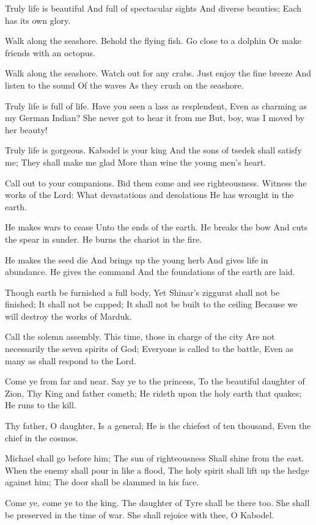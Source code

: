\documentclass[
]{book}
\begin{document}
Truly life is beautiful
And full of spectacular sights
And diverse beauties;
Each has its own glory.

Walk along the seashore.
Behold the flying fish.
Go close to a dolphin
Or make friends with an octopus.

Walk along the seashore.
Watch out for any crabs.
Just enjoy the fine breeze
And listen to the sound
Of the waves
As they crush on the seashore.

Truly life is full of life.
Have you seen a lass as resplendent,
Even as charming as my German Indian?
She never got to hear it from me
But, boy, was I moved by her beauty!

Truly life is gorgeous.
Kabodel is your king
And the sons of tsedek shall satisfy me;
They shall make me glad
More than wine the young men's heart.

Call out to your companions.
Bid them come and see righteousness.
Witness the works of the Lord:
What devastations and desolations
He has wrought in the earth.

He makes wars to cease
Unto the ends of the earth.
He breaks the bow
And cuts the spear in sunder.
He burns the chariot in the fire.

He makes the seed die
And brings up the young herb
And gives life in abundance.
He gives the command
And the foundations of the earth are laid.

Though earth be furnished a full body,
Yet Shinar's ziggurat shall not be finished;
It shall not be capped;
It shall not be built to the ceiling
Because we will destroy the works of Marduk.

Call the solemn assembly.
This time, those in charge of the city
Are not necessarily the seven spirits of God;
Everyone is called to the battle,
Even as many as shall respond to the Lord.

Come ye from far and near.
Say ye to the princess,
To the beautiful daughter of Zion,
Thy King and father cometh;
He rideth upon the holy earth that quakes;
He runs to the kill.

Thy father, O daughter,
Is a general;
He is the chiefest of ten thousand,
Even the chief in the cosmos.

Michael shall go before him;
The sun of righteousness
Shall shine from the east.
When the enemy shall pour in like a flood,
The holy spirit shall lift up the hedge against him;
The door shall be slammed in his face.

Come ye, come ye to the king.
The daughter of Tyre shall be there too.
She shall be preserved in the time of war.
She shall rejoice with thee, O Kabodel.
\end{document}
